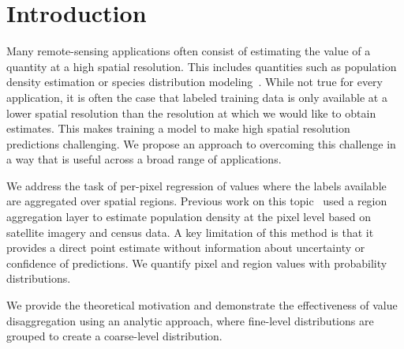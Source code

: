 \documentclass[10pt,twocolumn,a4paper]{article}
\begin{document}
\section{Introduction}

Many remote-sensing applications often consist of estimating the value of a quantity at a high spatial resolution. This includes quantities such as population density estimation or species distribution modeling~\cite{jacobs2018weakly}. While not true for every application, it is often the case that labeled training data is only available at a lower spatial resolution than the resolution at which we would like to obtain estimates. This makes training a model to make high spatial resolution predictions challenging. We propose an approach to overcoming this challenge in a way that is useful across a broad range of applications.

We address the task of per-pixel regression of values where the labels available are aggregated over spatial regions. Previous work on this topic~\cite{jacobs2018weakly} used a region aggregation layer to estimate population density at the pixel level based on satellite imagery and census data. A key limitation of this method is that it provides a direct point estimate without information about uncertainty or confidence of predictions. We quantify pixel and region values with probability distributions. 

We provide the theoretical motivation and demonstrate the effectiveness of value disaggregation using an analytic approach, where fine-level distributions are grouped to create a coarse-level distribution.


\end{document}
